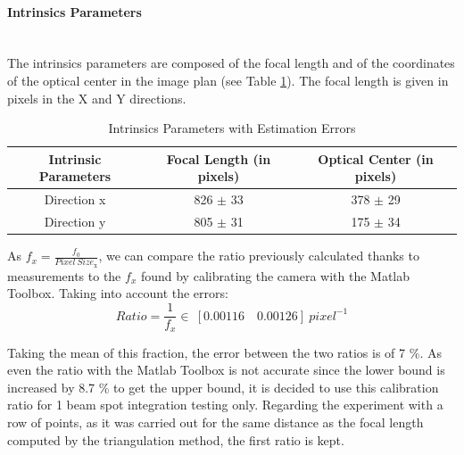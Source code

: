 \paragraph*{Intrinsics Parameters}
~\\
The intrinsics parameters are composed of the focal length and of the coordinates of the optical center in the image plan (see Table \ref{intrisicsPara}). The focal length is given in pixels in the X and Y directions. 

\begin{table}[H]
\centering
\caption{Intrinsics Parameters with Estimation Errors}
\label{intrisicsPara}
\renewcommand{\arraystretch}{1.5}
\begin{tabular}{|c|c|c|}
\hline
Intrinsic Parameters & Focal Length (in pixels) & Optical Center (in pixels)\\ \hline
Direction x & 826 $\pm$ 33 & 378 $\pm$ 29 \\ \hline
Direction y &  805 $\pm$ 31 & 175 $\pm$ 34 \\ 
\hline
\end{tabular}
\end{table}

As $f_x = \frac{f_0}{Pixel \ Size_{\text{x}}}$, we can compare the ratio previously calculated thanks to measurements to the $f_x$ found by calibrating the camera with the Matlab Toolbox. Taking into account the errors:
\begin{equation*}
Ratio = \frac{1}{f_x} \in \ [0.00116 \quad 0.00126] \ pixel^{-1}
\end{equation*}

Taking the mean of this fraction, the error between the two ratios is of 7 \%. As even the ratio with the Matlab Toolbox is not accurate since the lower bound is increased by 8.7 \% to get the upper bound, it is decided to use this calibration ratio for 1 beam spot integration testing only. Regarding the experiment with a row of points, as it was carried out for the same distance as the focal length computed by the triangulation method, the first ratio is kept. 

